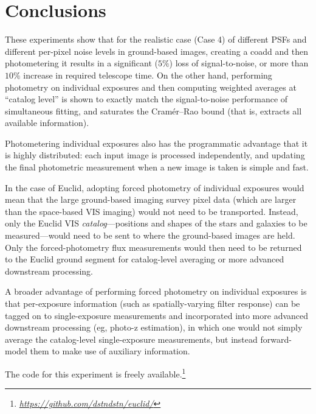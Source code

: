 \documentclass[a4paper,11pt]{article}
\newcommand{\niceurl}[1]{\href{#1}{\textsl{#1}}}
\begin{document}
\newpage
\section*{Conclusions}

These experiments show that for the realistic case (Case 4) of
different PSFs and different per-pixel noise levels in ground-based
images, creating a coadd and then photometering it results in a
significant ($5\%$) loss of signal-to-noise, or more than $10\%$
increase in required telescope time.  On the other hand, performing
photometry on individual exposures and then computing weighted
averages at ``catalog level'' is shown to exactly match the
signal-to-noise performance of simultaneous fitting, and saturates the
Cram\'er--Rao bound (that is, extracts all available information).

Photometering individual exposures also has the programmatic advantage
that it is highly distributed: each input image is processed
independently, and updating the final photometric measurement when a
new image is taken is simple and fast.

In the case of Euclid, adopting forced photometry of individual
exposures would mean that the large ground-based imaging survey pixel
data (which are larger than the space-based VIS imaging) would not
need to be transported.  Instead, only the Euclid VIS
\emph{catalog}---positions and shapes of the stars and galaxies to be
measured---would need to be sent to where the ground-based images are
held.  Only the forced-photometry flux measurements would then need to
be returned to the Euclid ground segment for catalog-level averaging
or more advanced downstream processing.

A broader advantage of performing forced photometry on individual
exposures is that per-exposure information (such as spatially-varying
filter response) can be tagged on to single-exposure measurements and
incorporated into more advanced downstream processing (eg,
\mbox{photo-z} estimation), in which one would not simply average the
catalog-level single-exposure measurements, but instead forward-model
them to make use of auxiliary information.


The code for this experiment is freely available.\footnote{%
  \niceurl{https://github.com/dstndstn/euclid/}}
\end{document}
